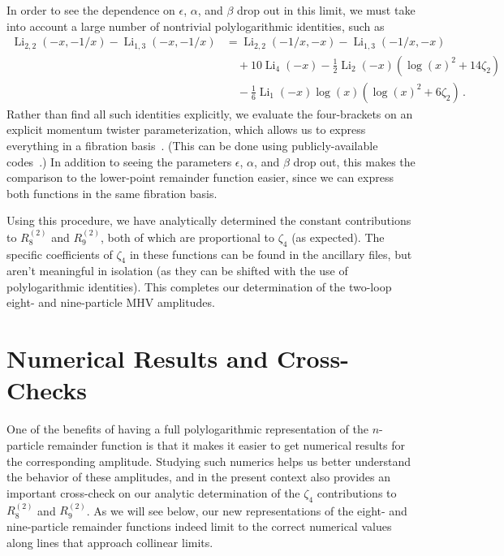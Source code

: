 \documentclass[11pt]{article}
\DeclareMathOperator{\Li}{Li}
\begin{document}
In order to see the dependence on $\epsilon$, $\alpha$, and $\beta$ drop out in this limit, we must take into account a large number of nontrivial polylogarithmic identities, such as
\begin{align}
\Li_{2, 2}(-x, -1/x) - \Li_{1, 3}(-x, -1/x) &=  \Li_{2, 2}(-1/x, -x) - \Li_{1, 3}(-1/x, -x)  \nonumber \\
&\quad  + 10 \Li_4(-x)  - \frac{1}{2} \Li_2(-x) \left( \log(x)^2 + 14 \zeta_2 \right)   \\ &\quad  - \frac{1}{6} \Li_1(- x) \log(x) \left( \log(x)^2 + 6 \zeta_2 \right) \, .   \nonumber
\end{align}
Rather than find all such identities explicitly, we evaluate the four-brackets on an explicit momentum twister parameterization, which allows us to express everything in a fibration basis~\cite{Brown:2009qja}. (This can be done using publicly-available codes~\cite{Panzer:2014caa,Duhr:2019tlz}.) In addition to seeing the parameters $\epsilon$, $\alpha$, and $\beta$ drop out, this makes the comparison to the lower-point remainder function easier, since we can express both functions in the same fibration basis.

Using this procedure, we have analytically determined the constant contributions to $R_8^{(2)}$\! and $R_9^{(2)}$\!, both of which are proportional to $\zeta_4$ (as expected). The specific coefficients of $\zeta_4$ in these functions can be found in the ancillary files, but aren't meaningful in isolation (as they can be shifted with the use of polylogarithmic identities). This completes our determination of the two-loop eight- and nine-particle MHV amplitudes.


\section{Numerical Results and Cross-Checks}

One of the benefits of having a full polylogarithmic representation of the $n$-particle remainder function is that it makes it easier to get numerical results for the corresponding amplitude. Studying such numerics helps us better understand the behavior of these amplitudes, and in the present context also provides an important cross-check on our analytic determination of the $\zeta_4$ contributions to $R_8^{(2)}$\! and $R_9^{(2)}$\!. As we will see below, our new representations of the eight- and nine-particle remainder functions indeed limit to the correct numerical values along lines that approach collinear limits.
\end{document}
